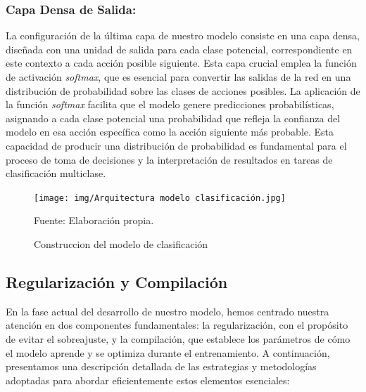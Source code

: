 \subsubsection{Capa Densa de Salida:} 
La configuración de la última capa de nuestro modelo consiste en una capa densa, diseñada con una unidad de salida para cada clase potencial, correspondiente en este contexto a cada acción posible siguiente. Esta capa crucial emplea la función de activación \textit{softmax}, que es esencial para convertir las salidas de la red en una distribución de probabilidad sobre las clases de acciones posibles. La aplicación de la función \textit{softmax} facilita que el modelo genere predicciones probabilísticas, asignando a cada clase potencial una probabilidad que refleja la confianza del modelo en esa acción específica como la acción siguiente más probable. Esta capacidad de producir una distribución de probabilidad es fundamental para el proceso de toma de decisiones y la interpretación de resultados en tareas de clasificación multiclase.
\begin{figure}[H]
    \begin{minipage}[t]{0.9\textwidth}
        \caption{Construccion del modelo de clasificación}
        \label{parquitectura_clasificación}        
    \end{minipage}

    \vspace{10pt}

    \begin{minipage}[b]{1\textwidth}
        \centering
        \texttt{[image: img/Arquitectura modelo clasificación.jpg]}        
    \end{minipage}

    \begin{minipage}[t]{0.9\textwidth}
        Fuente: Elaboración propia.
    \end{minipage}
\end{figure}

\subsection{Regularización y Compilación}
En la fase actual del desarrollo de nuestro modelo, hemos centrado nuestra atención en dos componentes fundamentales: la regularización, con el propósito de evitar el sobreajuste, y la compilación, que establece los parámetros de cómo el modelo aprende y se optimiza durante el entrenamiento. A continuación, presentamos una descripción detallada de las estrategias y metodologías adoptadas para abordar eficientemente estos elementos esenciales:

